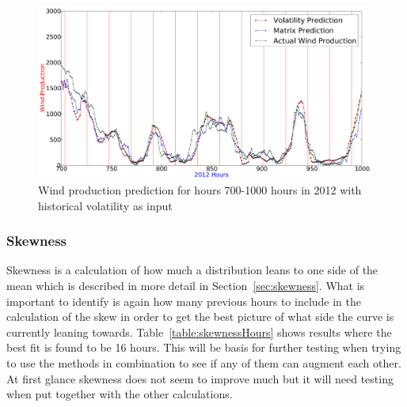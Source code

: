 \begin{figure}[H]
\centering
\includegraphics[width=0.99\textwidth]{billeder/volatilityBest700-1000.png}
\caption{Wind production prediction for hours 700-1000 hours in 2012 with historical volatility as input}
\label{fig:volatilityBest700-1000}
\end{figure} 

\subsubsection{Skewness}
Skewness is a calculation of how much a distribution leans to one side of the mean which is described in more detail in Section~\ref{sec:skewness}. What is important to identify is again how many previous hours to include in the calculation of the skew in order to get the best picture of what side the curve is currently leaning towards. Table~\ref{table:skewnessHours} shows results where the best fit is found to be 16 hours. This will be basis for further testing when trying to use the methods in combination to see if any of them can augment each other. At first glance skewness does not seem to improve much but it will need testing when put together with the other calculations.


